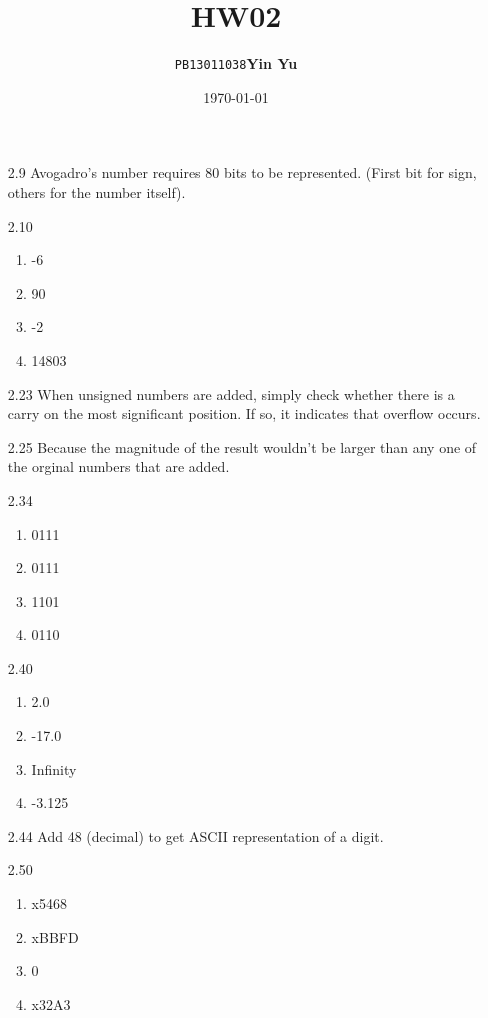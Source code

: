 \documentclass[a4paper]{article}
\title{\textbf{HW02}}
\author{\texttt{PB13011038}\quad\textbf{Yin Yu}}
\date{\today}
\begin{document}
\maketitle

\begin{enumerate}

\item[2.9] Avogadro's number requires 80 bits to be
  represented. (First bit for sign, others for the number itself).
  
\item[2.10]
  \begin{enumerate}
  \item -6
  \item 90
  \item -2
  \item 14803
  \end{enumerate}
  
\item[2.23] When unsigned numbers are added, simply check whether
  there is a carry on the most significant position. If so, it
  indicates that overflow occurs.

\item[2.25] Because the magnitude of the result wouldn't be larger
  than any one of the orginal numbers that are added.

\item[2.34]
  \begin{enumerate}
  \item 0111
  \item 0111
  \item 1101
  \item 0110
  \end{enumerate}

\item[2.40]
  \begin{enumerate}
  \item 2.0
  \item -17.0
  \item Infinity
  \item -3.125
  \end{enumerate}

\item[2.44] Add 48 (decimal) to get ASCII representation of a digit.

\item[2.50]
  \begin{enumerate}
  \item x5468
  \item xBBFD
  \item 0
  \item x32A3
  \end{enumerate}
  

\end{enumerate}
\end{document}
